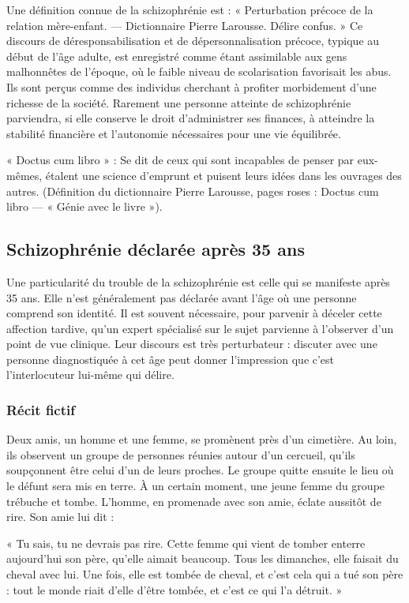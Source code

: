 \documentclass[12pt,oneside]{article}
\begin{document}
Une définition connue de la schizophrénie est : « Perturbation précoce de la relation mère-enfant. --- Dictionnaire Pierre Larousse. Délire confus. » Ce discours de déresponsabilisation et de dépersonnalisation précoce, typique au début de l'âge adulte, est enregistré comme étant assimilable aux gens malhonnêtes de l'époque, où le faible niveau de scolarisation favorisait les abus. Ils sont perçus comme des individus cherchant à profiter morbidement d'une richesse de la société. Rarement une personne atteinte de schizophrénie parviendra, si elle conserve le droit d'administrer ses finances, à atteindre la stabilité financière et l'autonomie nécessaires pour une vie équilibrée.

« Doctus cum libro » : Se dit de ceux qui sont incapables de penser par eux-mêmes, étalent une science d'emprunt et puisent leurs idées dans les ouvrages des autres. (Définition du dictionnaire Pierre Larousse, pages roses : Doctus cum libro --- « Génie avec le livre »).

\subsection{Schizophrénie déclarée après 35 ans}

Une particularité du trouble de la schizophrénie est celle qui se manifeste après 35 ans. Elle n'est généralement pas déclarée avant l'âge où une personne comprend son identité. Il est souvent nécessaire, pour parvenir à déceler cette affection tardive, qu'un expert spécialisé sur le sujet parvienne à l'observer d'un point de vue clinique. Leur discours est très perturbateur : discuter avec une personne diagnostiquée à cet âge peut donner l'impression que c'est l'interlocuteur lui-même qui délire.

\subsubsection*{Récit fictif}

Deux amis, un homme et une femme, se promènent près d'un cimetière. Au loin, ils observent un groupe de personnes réunies autour d'un cercueil, qu'ils soupçonnent être celui d'un de leurs proches. Le groupe quitte ensuite le lieu où le défunt sera mis en terre. À un certain moment, une jeune femme du groupe trébuche et tombe. L'homme, en promenade avec son amie, éclate aussitôt de rire. Son amie lui dit :

« Tu sais, tu ne devrais pas rire. Cette femme qui vient de tomber enterre aujourd'hui son père, qu'elle aimait beaucoup. Tous les dimanches, elle faisait du cheval avec lui. Une fois, elle est tombée de cheval, et c'est cela qui a tué son père : tout le monde riait d'elle d'être tombée, et c'est ce qui l'a détruit. »
\end{document}
